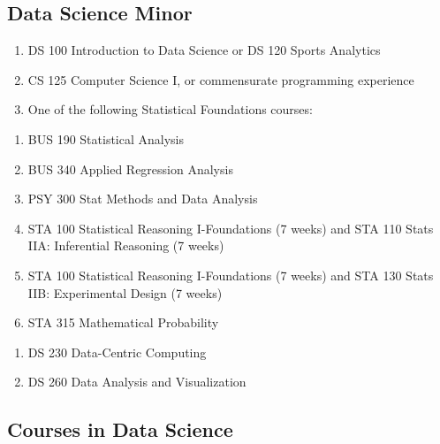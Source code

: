 \documentclass[
  letterpaper,
]{scrbook}
\providecommand{\tightlist}{%
  \setlength{\itemsep}{0pt}\setlength{\parskip}{0pt}}
\begin{document}
\subsection{Data Science Minor}\label{data-science-minor}

\begin{enumerate}
\def\labelenumi{\arabic{enumi}.}
\tightlist
\item
  DS 100 Introduction to Data Science or DS 120 Sports Analytics\\
\item
  CS 125 Computer Science I, or commensurate programming experience\\
\item
  One of the following Statistical Foundations courses:\\
\end{enumerate}

\begin{enumerate}
\def\labelenumi{\alph{enumi}.}
\tightlist
\item
  BUS 190 Statistical Analysis\\
\item
  BUS 340 Applied Regression Analysis\\
\item
  PSY 300 Stat Methods and Data Analysis\\
\item
  STA 100 Statistical Reasoning I-Foundations (7 weeks) and STA 110
  Stats IIA: Inferential Reasoning (7 weeks)\\
\item
  STA 100 Statistical Reasoning I-Foundations (7 weeks) and STA 130
  Stats IIB: Experimental Design (7 weeks)\\
\item
  STA 315 Mathematical Probability\\
\end{enumerate}

\begin{enumerate}
\def\labelenumi{\arabic{enumi}.}
\setcounter{enumi}{3}
\tightlist
\item
  DS 230 Data-Centric Computing
\item
  DS 260 Data Analysis and Visualization
\end{enumerate}

\subsection{Courses in Data Science}\label{courses-in-data-science}
\end{document}
